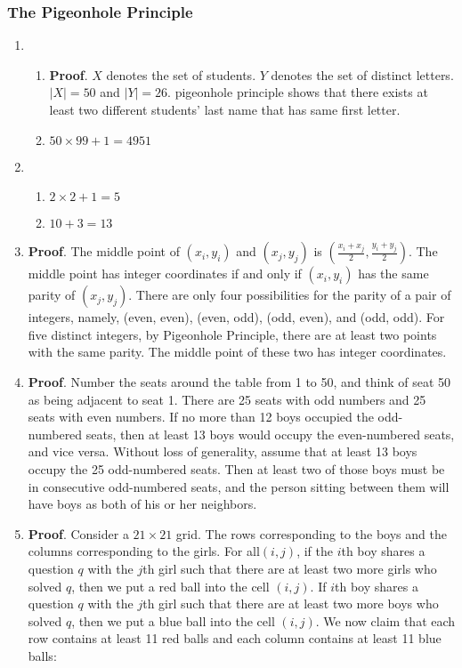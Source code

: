 \documentclass{../../cls/sig-alternate-05-2015}
\begin{document}
\subsubsection{The Pigeonhole Principle}
\begin{enumerate}
	\item\begin{enumerate}
		\item \textbf{Proof}. $X$ denotes the set of students. $Y$ denotes the set of distinct letters.
		$|X|=50$ and $|Y|=26$. pigeonhole principle shows that there exists at least two different students' last name that has same first letter.
		
		\item $50 \times 99 + 1=4951$
	\end{enumerate}
	
	\item \begin{enumerate}
		\item $2\times 2+1=5$
		
		\item $10+3=13$
	\end{enumerate}
	\item \textbf{Proof}. The middle point of $(x_i, y_i)$ and $(x_j, y_j)$ is $(\frac{x_i + x_j}{2}, \frac{y_i + y_j}{2})$. The middle point has integer coordinates if and only if $(x_i, y_i)$ has the same parity of $(x_j, y_j)$.  There are only
	four possibilities for the parity of a pair of integers, namely, (even, even), (even, odd),
	(odd, even), and (odd, odd). For five distinct integers, by Pigeonhole Principle, there
	are at least two points with the same parity. The middle point of these two has integer
	coordinates.
	
	\item \textbf{Proof}. Number the seats around the table
	from 1 to 50, and think of seat 50 as being adjacent to seat 1.
	There are 25 seats with odd numbers and 25 seats with even
	numbers. If no more than 12 boys occupied the odd-numbered seats, then at least 13 boys would occupy the even-numbered
	seats, and vice versa. Without loss of generality, assume that
	at least 13 boys occupy the 25 odd-numbered seats. Then at
	least two of those boys must be in consecutive odd-numbered
	seats, and the person sitting between them will have boys as
	both of his or her neighbors.
	
	\item \textbf{Proof}. Consider a $21 \times 21$ grid. The rows corresponding to the boys and the columns corresponding to the girls. For all$(i, j)$, if the	$i$th boy shares a question $q$ with the $j$th girl	such that there are at least two more girls who solved $q$, then we put a red ball into the	cell $(i, j)$. If $i$th boy shares a question $q$ with the $j$th girl such that there are at least two more boys who solved	$q$, then we put a blue ball into the cell $(i, j)$.  We now claim that each row contains at least 11 red balls and each column contains at least 11 blue balls:


\end{enumerate}
\end{document}

